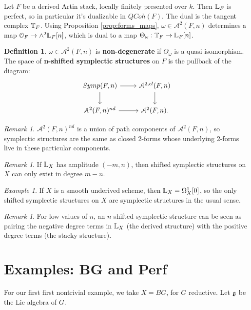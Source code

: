 \documentclass[10pt,a4paper,reqno,oneside]{book} %
\theoremstyle{plain}
\theoremstyle{definition}
\newtheorem{defin}[thm]{Definition}
\theoremstyle{remark}
\newtheorem{eg}[thm]{Example}
\newtheorem{rem}[thm]{Remark}
\numberwithin{equation}{section}
\begin{document}
Let $F$ be a derived Artin stack, locally finitely presented over $k$. Then $\mathbb L_F$ is perfect, so in particular it's
dualizable in $QCoh(F)$. The dual is the tangent complex $\mathbb T_F$.
Using Proposition \ref{prop:forms_maps}, $\omega \in \mathcal{A}^2(F,n)$ determines a map $\mathcal{O}_F \to
\wedge^2 \mathbb L_F[n]$, which is dual to a map $ \Theta_{\omega}: \mathbb T_F \to \mathbb L_F[n]$.

\begin{defin}
$\omega \in \mathcal{A}^2(F,n)$ is \textbf{non-degenerate} if $\Theta_{\omega}$ is a quasi-isomorphism. The space of
\textbf{n-shifted symplectic structures} on $F$ is the pullback of the diagram:
\[
\begin{tikzcd}
Symp(F,n)\arrow{d}\arrow{r} & \mathcal{A}^{2,cl}(F,n)\arrow{d} \\
\mathcal{A}^2(F,n)^{nd}\arrow{r} & \mathcal{A}^2(F,n).
\end{tikzcd}
\]
\end{defin}

\begin{rem}
$\mathcal{A}^2(F,n)^{nd}$ is a union of path components of $\mathcal{A}^2(F,n)$, so symplectic structures are the same as
closed 2-forms whose underlying 2-forms live in these particular components.
\end{rem}

\begin{rem}
If $\mathbb L_X$ has amplitude $(-m,n)$, then shifted symplectic structures on $X$ can only exist in degree $m-n$.
\end{rem}

\begin{eg}
If $X$ is a smooth underived scheme, then $\mathbb L_X = \Omega^1_X[0]$, so the only shifted symplectic structures on $X$
are symplectic structures in the usual sense.
\end{eg}

\begin{rem}
For low values of $n$, an $n$-shifted symplectic structure can be seen as pairing the negative degree terms in $\mathbb L_X$
(the derived structure) with the positive degree terms (the stacky structure).
\end{rem}


\section{Examples: BG and Perf}
For our first first nontrivial example, we take $X = BG$, for $G$ reductive. Let $\mathfrak g$ be the Lie algebra of $G$.
\end{document}
